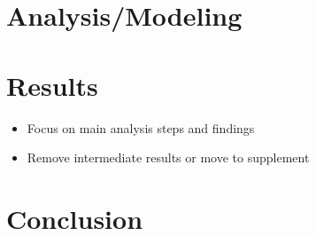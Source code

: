 \documentclass[10pt,parskip=half,
toc=sectionentrywithdots,
bibliography=totocnumbered,
captions=tableheading,numbers=noendperiod]{scrartcl}
\providecommand{\tightlist}{%
  \setlength{\itemsep}{0pt}\setlength{\parskip}{0pt}}
\begin{document}
\hypertarget{analysismodeling}{%
\section{Analysis/Modeling}\label{analysismodeling}}

\hypertarget{results}{%
\section{Results}\label{results}}

\begin{itemize}
\tightlist
\item
  Focus on main analysis steps and findings
\item
  Remove intermediate results or move to supplement
\end{itemize}

\hypertarget{conclusion}{%
\section{Conclusion}\label{conclusion}}



\end{document}
